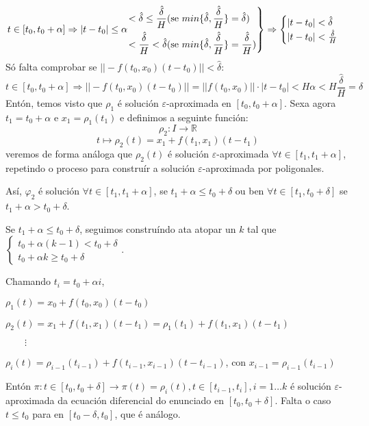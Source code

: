 \documentclass[11pt, a4paper,twoside]{article}
\makeatletter
\theoremstyle{theorem-style}  %
\renewenvironment{proof}[1][\proofname]{\par
	\pushQED{\qed}%
	\normalfont \topsep6\p@\@plus6\p@\relax
	\list{}{%
		\settowidth{\leftmargin}{\quad:\hskip\labelsep}%
		\setlength{\labelwidth}{0pt}%
		\setlength{\itemindent}{-\leftmargin}%
	}%
	\item[\hskip\labelsep\itshape#1\@addpunct{:}]\ignorespaces
}{%
	\popQED\endlist\@endpefalse
}
\theoremstyle{definition-style}
\theoremstyle{example-style}
\newenvironment{rcases}
{\left.\begin{aligned}}
	{\end{aligned}\right\rbrace}
\makeatother
\begin{document}
\begin{proof}
	\[ t \in [t_0, t_0+\alpha]\Rightarrow |t-t_0|\leq \alpha  
	\begin{rcases}
	< \hat{\delta}\leq\frac{\hat{\delta}}{H} \text{(se } min\{ \hat{\delta}, \frac{\hat{\delta}}{H}\}= \hat{\delta})\ \  \\
	< \frac{\hat{\delta}}{H}<\hat{\delta} \text{(se }  min\{ \hat{\delta}, \frac{\hat{\delta}}{H}\}=  \frac{\hat{\delta}}{H})
	\end{rcases}\Rightarrow \begin{cases}
	|t-t_0|<\hat{\delta}\\
	|t-t_0|<\frac{\hat{\delta}}{H}
	\end{cases}
	 \]
	 Só falta comprobar se $ || -f(t_0,x_0)(t-t_0)||< \hat{\delta} $:	 
	  \[ t \in [t_0, t_0+\alpha]\Rightarrow ||-f(t_0,x_0)(t-t_0)|| = || f(t_0,x_0)||\cdot|t-t_0|<H\alpha < H \frac{\hat{\delta}}{H}= \hat{\delta}   \]
	Entón, temos visto que $ \rho_1 $ é solución $ \varepsilon $-aproximada en $ [t_0,t_0+\alpha] $. Sexa agora $ t_1=t_0+\alpha $ e $ x_1=\rho_1(t_1) $ e definimos a seguinte función:
	\[ \rho_2:I\longrightarrow \mathbb{R} \]
	\[ t \longmapsto \rho_2(t)=x_1+f(t_1,x_1)(t-t_1) \]
	veremos de forma análoga que $ \rho_2(t) $ é solución $ \varepsilon $-aproximada $  \forall t \in [t_1,t_1+\alpha]  $, repetindo o proceso para construír a solución $ \varepsilon $-aproximada por poligonales. 
	
	
	Así, $ \varphi_2 $ é solución $ \forall t \in [t_1,t_1+\alpha] $, se $ t_1+\alpha\leq t_0+\delta $ ou ben $\forall t \in [t_1, t_0+\delta] $ se $ t_1+\alpha >t_0+\delta $. 
	
	Se $ t_1+\alpha \leq t_0 +\delta $, seguimos construíndo ata atopar un $ k $ tal que $ \begin{cases}
	t_0+\alpha (k-1)<t_0+\delta\\
	t_0+\alpha k\geq t_0 +\delta
	\end{cases} $.
	
	Chamando $ t_i=t_0+\alpha i $,
	
	\begin{adjustwidth}{1cm}{}
		$ \rho_1(t)=x_0+f(t_0,x_0)(t-t_0) $
	
		$ \rho_2(t)=x_1+f(t_1,x_1)(t-t_1)=\rho_1(t_1)+f(t_1,x_1)(t-t_1) $
	
		$ \qquad \vdots $
	
		$\rho_i (t)=\rho_{i-1}(t_{i-1})+f(t_{i-1},x_{i-1})(t-t_{i-1})  $, con $ x_{i-1}=\rho_{i-1}(t_{i-1}) $
	\end{adjustwidth}

	Entón $ \pi: t \in [t_0, t_0+\delta]\longrightarrow \pi(t)=\rho_i(t), t \in [t_{i-1}, t_i], i=1\dots k  $ é solución $ \varepsilon $-aproximada da ecuación diferencial do enunciado en $ [t_0, t_0+\delta] $. Falta o caso $ t\leq t_0 $ para en $ [t_0-\delta, t_0] $, que é análogo.
\end{proof}
\end{document}
